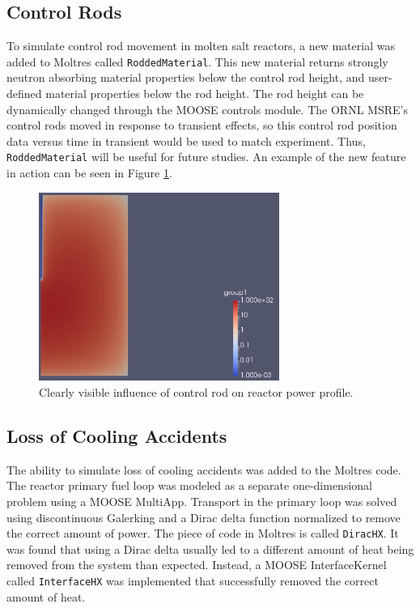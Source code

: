 \documentclass[12pt]{article}
\begin{document}
\subsection{Control Rods}

To simulate control rod movement in molten salt reactors, a new material was added to Moltres \cite{moltres} called \texttt{RoddedMaterial}. This new material returns strongly neutron absorbing material properties below the control rod height, and user-defined material properties below the rod height. The rod height can be dynamically changed through the MOOSE controls module. The ORNL MSRE's control rods moved in response to transient effects, so this control rod position data versus time in transient would be used to match experiment. Thus, \texttt{RoddedMaterial} will be useful for future studies. An example of the new feature in action can be seen in Figure \ref{fig:controlrod}.

\begin{figure}
\centering
\includegraphics[width=0.7\textwidth]{controlrod}
\caption{Clearly visible influence of control rod on reactor power profile.}
\label{fig:controlrod}
\end{figure}

\subsection{Loss of Cooling Accidents}

The ability to simulate loss of cooling accidents was added to the Moltres code. The reactor primary fuel loop was modeled as a separate one-dimensional problem using a MOOSE MultiApp. Transport in the primary loop was solved using discontinuous Galerking and a Dirac delta function normalized to remove the correct amount of power. The piece of code in Moltres is called \texttt{DiracHX}. It was found that using a Dirac delta usually led to a different amount of heat being removed from the system than expected. Instead, a MOOSE InterfaceKernel called \texttt{InterfaceHX} was implemented that successfully removed the correct amount of heat.
\end{document}

